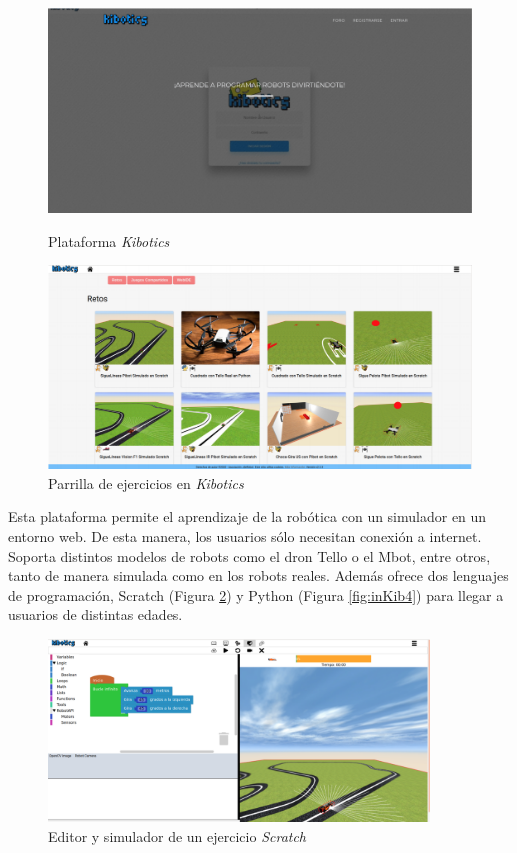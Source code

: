\begin{figure}[!htb]
    \includegraphics[width=\linewidth]{figures/introduccion/kibotics1.png}
    \caption{Plataforma \textit{Kibotics}}\label{fig:inKib1}
\endminipage\hfill
{}
    \includegraphics[width=\linewidth]{figures/introduccion/kibotics2.png}
    \caption{Parrilla de ejercicios en \textit{Kibotics}}\label{fig:inKib2}
\endminipage\hfill
\end{figure}


Esta plataforma permite el aprendizaje de la robótica con un simulador en un entorno web. De esta manera, los usuarios sólo necesitan conexión a internet. Soporta distintos modelos de robots como el dron Tello o el Mbot, entre otros, tanto de manera simulada como en los robots reales. Además ofrece dos lenguajes de programación, Scratch (Figura \ref{fig:inKib3}) y Python (Figura \ref{fig:inKib4}) para llegar a usuarios de distintas edades.

 \begin{figure}[!htb]
  \begin{center}
   \includegraphics[width=0.9\textwidth]{figures/introduccion/kibotics3.png}
		\caption{Editor y simulador de un ejercicio \textit{Scratch}}
		\label{fig:inKib3}
		\end{center}
\end{figure}

